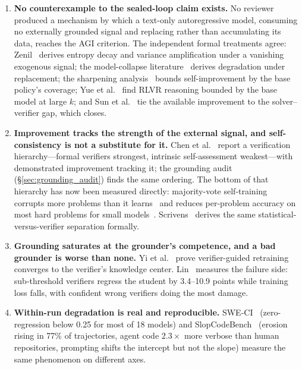 \documentclass[11pt,a4paper]{article}
\begin{document}
\begin{enumerate}
    \item \textbf{No counterexample to the sealed-loop claim exists.} No reviewer produced a mechanism by which a text-only autoregressive model, consuming no externally grounded signal and replacing rather than accumulating its data, reaches the AGI criterion. The independent formal treatments agree: Zenil~\cite{limitsself2025} derives entropy decay and variance amplification under a vanishing exogenous signal; the model-collapse literature~\cite{shumailov2024model,dohmatob2024strong,seddik2024synthetic} derives degradation under replacement; the sharpening analysis~\cite{huang2024sharpening} bounds self-improvement by the base policy's coverage; Yue et al.~\cite{yue2025rlvr} find RLVR reasoning bounded by the base model at large $k$; and Sun et al.~\cite{sun2025solververifier} tie the available improvement to the solver--verifier gap, which closes.
    \item \textbf{Improvement tracks the strength of the external signal, and self-consistency is not a substitute for it.} Chen et al.~\cite{chen2026rsi} report a verification hierarchy---formal verifiers strongest, intrinsic self-assessment weakest---with demonstrated improvement tracking it; the grounding audit (\S\ref{sec:grounding_audit}) finds the same ordering. The bottom of that hierarchy has now been measured directly: majority-vote self-training corrupts more problems than it learns~\cite{lin2026ttrl} and reduces per-problem accuracy on most hard problems for small models~\cite{bahuguna2026selfconsistency}. Scrivens~\cite{scrivens2026safety} derives the same statistical-versus-verifier separation formally.
    \item \textbf{Grounding saturates at the grounder's competence, and a bad grounder is worse than none.} Yi et al.~\cite{yi2026escaping} prove verifier-guided retraining converges to the verifier's knowledge center. Lin~\cite{lin2026verifiers} measures the failure side: sub-threshold verifiers regress the student by 3.4--10.9 points while training loss falls, with confident wrong verifiers doing the most damage.
    \item \textbf{Within-run degradation is real and reproducible.} SWE-CI~\cite{chen2025sweci} (zero-regression below 0.25 for most of 18 models) and SlopCodeBench~\cite{orlanski2026slop} (erosion rising in 77\% of trajectories, agent code $2.3\times$ more verbose than human repositories, prompting shifts the intercept but not the slope) measure the same phenomenon on different axes.
\end{enumerate}
\end{document}
